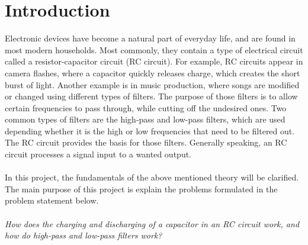 \chapter{Introduction}
Electronic devices have become a natural part of everyday life, and are found in most modern households. Most commonly, they contain a type of electrical circuit called a resistor-capacitor circuit (RC circuit). For example, RC circuits appear in camera flashes, where a capacitor quickly releases charge, which creates the short burst of light. Another example is in music production, where songs are modified or changed using different types of filters. The purpose of those filters is to allow certain frequencies to pass through, while cutting off the undesired ones. Two common types of filters are the high-pass and low-pass filters, which are used depending whether it is the high or low frequencies that need to be filtered out. The RC circuit provides the basis for those filters. Generally speaking, an RC circuit processes a signal input to a wanted output. 
\\ \\
In this project, the fundamentals of the above mentioned theory will be clarified. The main purpose of this project is explain the problems formulated in the problem statement below.
\\ \\
\textit{How does the charging and discharging of a capacitor in an RC circuit work, and how do high-pass and low-pass filters work?}

